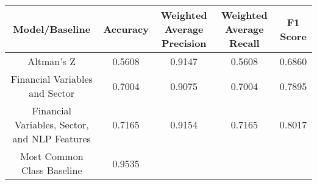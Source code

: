 \footnotesize
\begin{tabular}{ccccc}
\toprule
Model/Baseline & Accuracy & Weighted Average Precision & Weighted Average Recall & F1 Score \\
\midrule
Altman's Z & 0.5608 & 0.9147 & 0.5608 & 0.6860 \\
Financial Variables and Sector & 0.7004 & 0.9075 & 0.7004 & 0.7895 \\
Financial Variables, Sector, and NLP Features & 0.7165 & 0.9154 & 0.7165 & 0.8017 \\
Most Common Class Baseline & 0.9535 &  &  &  \\
\bottomrule
\end{tabular}

\normalsize
